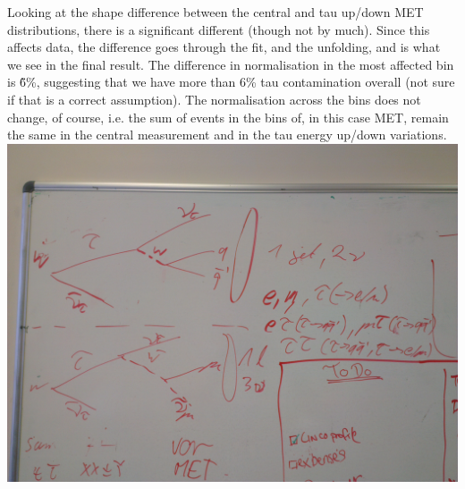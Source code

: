 Looking at the shape difference between the central and tau up/down MET distributions, there is a significant
different (though not by much). Since this affects data, the difference goes through the fit, and the
unfolding, and is what we see in the final result. The difference in normalisation in the most affected bin is
\~6\%, suggesting that we have more than 6\% tau contamination overall (not sure if that is a correct
assumption). The normalisation across the bins does not change, of course, i.e. the sum of events in the bins
of, in this case MET, remain the same in the central measurement and in the tau energy up/down variations.
\includegraphics[width=\textwidth]{Chapters/04_Analysis/Images/IMG_20150219_160840.jpg}
